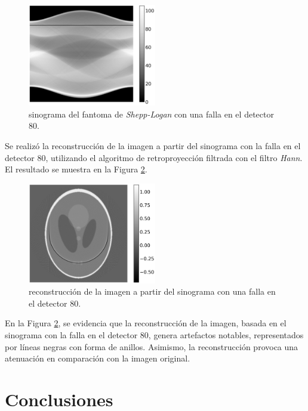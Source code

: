 \documentclass[11pt, twocolumn]{article}
\begin{document}
\begin{figure}
    \centering
    \includegraphics[width=0.5\textwidth]{images/ej_7/sinogram_line.png}
    \caption{sinograma del fantoma de \textit{Shepp-Logan} con una falla en el detector 80.}
    \label{fig:sinograma_falla}
\end{figure}

Se realizó la reconstrucción de la imagen a partir del sinograma con la falla en el detector 80, utilizando el algoritmo de retroproyección filtrada con el filtro \textit{Hann}. El resultado se muestra en la Figura \ref{fig:reconstruccion_falla}.

\begin{figure}
    \centering
    \includegraphics[width=0.5\textwidth]{images/ej_7/reconstruction_line.png}
    \caption{reconstrucción de la imagen a partir del sinograma con una falla en el detector 80.}
    \label{fig:reconstruccion_falla}
\end{figure}

En la Figura \ref{fig:reconstruccion_falla}, se evidencia que la reconstrucción de la imagen, basada en el sinograma con la falla en el detector 80, genera artefactos notables, representados por líneas negras con forma de anillos. Asimismo, la reconstrucción provoca una atenuación en comparación con la imagen original.

\section{Conclusiones}
\end{document}
